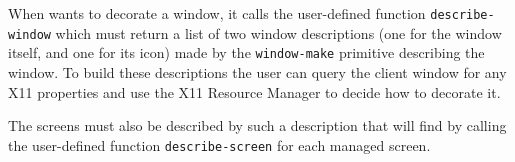 When {\GWM} wants to decorate a window, it calls the user-defined {\WOOL}
function \verb"describe-window" which must return a list of two window
descriptions (one for the window itself, and one for its icon) made by the
\verb"window-make" {\WOOL} primitive describing the window. To build these
descriptions the user can query the client window for any X11 properties and
use the X11 Resource Manager to decide how to decorate it.

The screens must also be described by such a description that {\GWM} will find
by calling the user-defined {\WOOL} function \verb"describe-screen" for each
managed screen.
